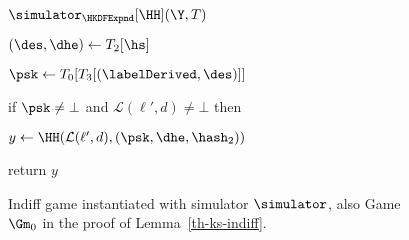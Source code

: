 \begin{figure}[tp]
\begin{minipage}[t]{0.49\textwidth}
\begin{oracle}{$\simulator_{\HKDFExpnd}[\HH](\Y, T)$}
				\item \quad $(\des, \dhe) \gets T_2[\hs]$
				\item \quad $\psk \gets T_0[T_3[(\labelDerived, \des)]]$
				\item \quad if $\psk \neq \bot$ and $\mathcal{L}(\ell', d) \neq \bot$ then
				\item \quad \quad $y \gets \HH(\mathcal{L} (\ell', d),(\psk, \dhe,\hash_2))$
				\item return $y$
			\end{oracle}
		\end{minipage}
		\label{fig:gm0-ks-indiff}
		\caption{Indiff game instantiated with simulator $\simulator$, also Game $\Gm_0$ in the proof of Lemma~\ref{th-ks-indiff}.}
	\end{figure}

\begin{figure}[tp]
	\begin{minipage}[t]{0.48\textwidth}
		

\end{minipage}
\end{figure}
